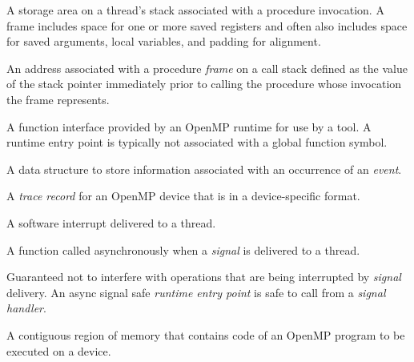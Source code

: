 \glossarydefstart
A storage area on a thread's stack associated with a procedure invocation. A frame includes space for 
one or more saved registers and often also includes space for saved arguments, local variables, 
and padding for alignment.
\glossarydefend

\glossarydefstart
An address associated with a procedure \emph{frame} on a call stack defined as the value of the stack pointer immediately prior 
to calling the procedure whose invocation the frame represents.
\glossarydefend

\glossarydefstart
A function interface provided by an OpenMP runtime for use by a tool. A runtime entry point is
typically not associated with a global function symbol.
\glossarydefend

\glossarydefstart
A data structure to store information associated with an occurrence of an \emph{event}.
\glossarydefend

\glossarydefstart
A \emph{trace record} for an OpenMP device that is in a device-specific format. 
\glossarydefend

\glossarydefstart
A software interrupt delivered to a thread.
\glossarydefend

\glossarydefstart
A function called asynchronously when a \emph{signal} is delivered to a thread.
\glossarydefend

\glossarydefstart
Guaranteed not to interfere with operations that are being interrupted by \emph{signal} delivery. 
An async signal safe \emph{runtime entry point} is safe to call from a \emph{signal handler}.
\glossarydefend

\glossarydefstart
A contiguous region of memory that contains code of an OpenMP program to be executed on a device.
\glossarydefend




